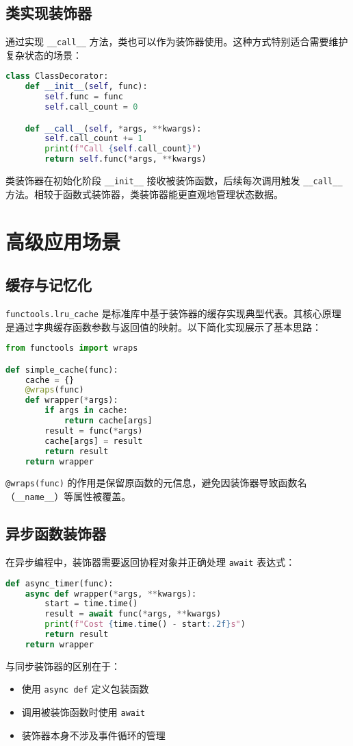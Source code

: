 \section{类实现装饰器}
通过实现 \verb!__call__! 方法，类也可以作为装饰器使用。这种方式特别适合需要维护复杂状态的场景：\par
\begin{lstlisting}[language=python]
class ClassDecorator:
    def __init__(self, func):
        self.func = func
        self.call_count = 0

    def __call__(self, *args, **kwargs):
        self.call_count += 1
        print(f"Call {self.call_count}")
        return self.func(*args, **kwargs)
\end{lstlisting}
类装饰器在初始化阶段 \verb!__init__! 接收被装饰函数，后续每次调用触发 \verb!__call__! 方法。相较于函数式装饰器，类装饰器能更直观地管理状态数据。\par
\chapter{高级应用场景}
\section{缓存与记忆化}
\verb!functools.lru_cache! 是标准库中基于装饰器的缓存实现典型代表。其核心原理是通过字典缓存函数参数与返回值的映射。以下简化实现展示了基本思路：\par
\begin{lstlisting}[language=python]
from functools import wraps

def simple_cache(func):
    cache = {}
    @wraps(func)
    def wrapper(*args):
        if args in cache:
            return cache[args]
        result = func(*args)
        cache[args] = result
        return result
    return wrapper
\end{lstlisting}
\verb!@wraps(func)! 的作用是保留原函数的元信息，避免因装饰器导致函数名（\verb!__name__!）等属性被覆盖。\par
\section{异步函数装饰器}
在异步编程中，装饰器需要返回协程对象并正确处理 \verb!await! 表达式：\par
\begin{lstlisting}[language=python]
def async_timer(func):
    async def wrapper(*args, **kwargs):
        start = time.time()
        result = await func(*args, **kwargs)
        print(f"Cost {time.time() - start:.2f}s")
        return result
    return wrapper
\end{lstlisting}
与同步装饰器的区别在于：\par
\begin{itemize}
\item 使用 \verb!async def! 定义包装函数
\item 调用被装饰函数时使用 \verb!await!
\item 装饰器本身不涉及事件循环的管理
\end{itemize}
